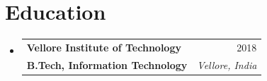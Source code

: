 \documentclass[letterpaper,10pt]{article}
\makeatletter
\newcommand{\resumeSubheading}[4]{
  \vspace{-2pt}\item
    \begin{tabular*}{0.97\textwidth}[t]{l@{\extracolsep{\fill}}r}
      \textbf{#1} & #2 \\
      \textbf{\small \textcolor{accent}{#3}} & \textit{\small #4} \\
    \end{tabular*}\vspace{-7pt}
}
\newcommand{\resumeSubHeadingListStart}{\begin{itemize}[leftmargin=0.15in, label={}]}
\newcommand{\resumeSubHeadingListEnd}{\end{itemize}}
\makeatother
\begin{document}
\section{Education}
  \resumeSubHeadingListStart
    \resumeSubheading
      {Vellore Institute of Technology}{2018}
      {B.Tech, Information Technology}{Vellore, India}
  \resumeSubHeadingListEnd
\end{document}
